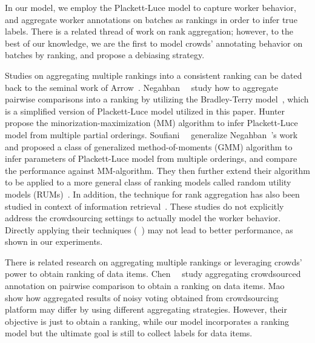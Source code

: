 In our model, we employ the Plackett-Luce model to capture worker behavior, 
and aggregate worker annotations on batches as rankings in order to infer true labels.  
There is a related thread of work on rank aggregation; 
however, to the best of our knowledge, 
we are the first to model crowds' annotating behavior on batches by ranking, 
and propose a debiasing strategy. 

Studies on aggregating multiple rankings into a consistent ranking can be dated back to the seminal work of Arrow~\cite{arrow2012social}.  
Negahban~\etal~\cite{negahban:nips2012} study how to aggregate pairwise comparisons into a ranking 
by utilizing the Bradley-Terry model~\cite{bradley:1952}, which is a simplified version of Plackett-Luce model utilized in this paper.   
Hunter~\etal~\cite{hunter:aos2004} propose the minorization-maximization (MM) algorithm to infer Plackett-Luce model 
from multiple partial orderings.  
Soufiani~\etal~\cite{soufiani:nips2013} generalize Negahban~\etal's work 
and proposed a class of generalized method-of-moments (GMM) algorithm 
to infer parameters of Plackett-Luce model from multiple orderings, 
and compare the performance against MM-algorithm.  
They then further extend their algorithm 
to be applied to a more general class of ranking models called random utility models (RUMs)~\cite{soufiani:icml2014}.  
In addition, the technique for rank aggregation has also been studied 
in context of information retrieval~\cite{dwork:www2001,klementiev:icml2008,liu:www2007,qin:nips2010,volkovs:www2012}.  
These studies do not explicitly address the crowdsourcing settings 
to actually model the worker behavior.  
Directly applying their techniques (\eg~\cite{hunter:aos2004}) may not lead to better performance, 
as shown in our experiments.  

There is related research on aggregating multiple rankings or leveraging crowds' power to obtain ranking of data items.  
Chen~\etal~\cite{chen:wsdm2013} study aggregating crowdsourced annotation on pairwise comparison to obtain a ranking on data items. 
Mao~\etal~\cite{mao:aaai2013} show how aggregated results of noisy voting obtained from crowdsourcing platform 
may differ by using different aggregating strategies.  
However, their objective is just to obtain a ranking, 
while our model incorporates a ranking model but the ultimate goal is still to collect labels for data items.  


